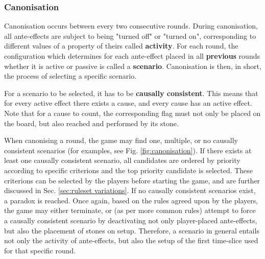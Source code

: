 \documentclass[12pt]{article}
\begin{document}
	\subsubsection{Canonisation}\label{sec:canonisation}
	Canonisation occurs between every two consecutive rounds. During canonisation, all ante-effects are subject to being "turned off" or "turned on", corresponding to different values of a property of theirs called \textbf{activity}. For each round, the configuration which determines for each ante-effect placed in all \textbf{previous} rounds whether it is active or passive is called a \textbf{scenario}. Canonisation is then, in short, the process of selecting a specific scenario.
	
	For a scenario to be selected, it has to be \textbf{causally consistent}. This means that for every active effect there exists a cause, and every cause has an active effect. Note that for a cause to count, the corresponding flag must not only be placed on the board, but also reached and performed by its stone.
	
	When canonising a round, the game may find one, multiple, or no causally consistent scenarios (for examples, see Fig. \ref{fig:canonisation}). If there exists at least one causally consistent scenario, all candidates are ordered by priority according to specific criterions and the top priority candidate is selected. These criterions can be selected by the players before starting the game, and are further discussed in Sec. \ref{sec:ruleset variations}. If no causally consistent scenarios exist, a paradox is reached. Once again, based on the rules agreed upon by the players, the game may either terminate, or (as per more common rules) attempt to force a causally consistent scenario by deactivating not only player-placed ante-effects, but also the placement of stones on setup. Therefore, a scenario in general entails not only the activity of ante-effects, but also the setup of the first time-slice used for that specific round.
	
\end{document}
